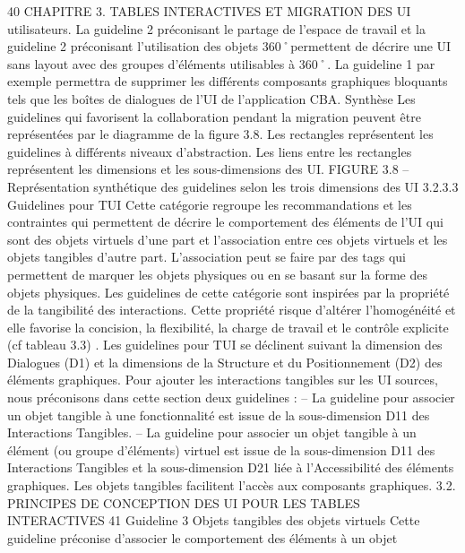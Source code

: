 \documentclass{article}
\begin{document}
40
CHAPITRE 3. TABLES INTERACTIVES ET MIGRATION DES UI
utilisateurs. La guideline 2 pr\'{e}conisant le partage de l’espace de travail et la guideline 2 pr\'{e}conisant
l’utilisation des objets 360˚permettent de d\'{e}crire une UI sans layout avec des groupes d’\'{e}l\'{e}ments
utilisables \`{a} 360˚. La guideline 1 par exemple permettra de supprimer les diff\'{e}rents composants graphiques bloquants tels que les bo\^{i}tes de dialogues de l’UI de l’application CBA.
Synth\`{e}se
Les guidelines qui favorisent la collaboration pendant la migration peuvent \^{e}tre repr\'{e}sent\'{e}es par le diagramme de la ﬁgure 3.8. Les rectangles repr\'{e}sentent les guidelines \`{a} diff\'{e}rents niveaux
d’abstraction. Les liens entre les rectangles repr\'{e}sentent les dimensions et les sous-dimensions des
UI.
FIGURE 3.8 – Repr\'{e}sentation synth\'{e}tique des guidelines selon les trois dimensions des UI
3.2.3.3
Guidelines pour TUI
Cette cat\'{e}gorie regroupe les recommandations et les contraintes qui permettent de d\'{e}crire le comportement des \'{e}l\'{e}ments de l’UI qui sont des objets virtuels d’une part et l’association entre ces objets
virtuels et les objets tangibles d’autre part. L’association peut se faire par des tags qui permettent de
marquer les objets physiques ou en se basant sur la forme des objets physiques. Les guidelines de
cette cat\'{e}gorie sont inspir\'{e}es par la propri\'{e}t\'{e} de la tangibilit\'{e} des interactions. Cette propri\'{e}t\'{e} risque
d’alt\'{e}rer l’homog\'{e}n\'{e}it\'{e} et elle favorise la concision, la ﬂexibilit\'{e}, la charge de travail et le contr\^{o}le
explicite (cf tableau 3.3) .
Les guidelines pour TUI se d\'{e}clinent suivant la dimension des Dialogues (D1) et la dimensions de
la Structure et du Positionnement (D2) des \'{e}l\'{e}ments graphiques. Pour ajouter les interactions tangibles
sur les UI sources, nous pr\'{e}conisons dans cette section deux guidelines :
– La guideline pour associer un objet tangible \`{a} une fonctionnalit\'{e} est issue de la sous-dimension
D11 des Interactions Tangibles.
– La guideline pour associer un objet tangible \`{a} un \'{e}l\'{e}ment (ou groupe d’\'{e}l\'{e}ments) virtuel est
issue de la sous-dimension D11 des Interactions Tangibles et la sous-dimension D21 li\'{e}e \`{a}
l’Accessibilit\'{e} des \'{e}l\'{e}ments graphiques. Les objets tangibles facilitent l’acc\`{e}s aux composants
graphiques.
3.2. PRINCIPES DE CONCEPTION DES UI POUR LES TABLES INTERACTIVES
41
Guideline 3 Objets tangibles des objets virtuels
Cette guideline pr\'{e}conise d’associer le comportement des \'{e}l\'{e}ments \`{a} un objet
\end{document}
